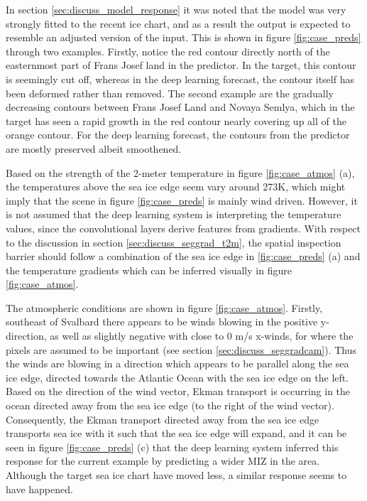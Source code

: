 \documentclass[../main/thesis]{subfiles}
\begin{document}
In section \ref{sec:discuss_model_response} it was noted that the model was very strongly fitted to the recent ice chart, and as a result the output is expected to resemble an adjusted version of the input. This is shown in figure \ref{fig:case_preds} through two examples. Firstly, notice the red contour directly north of the easternmost part of Frans Josef land in the predictor. In the target, this contour is seemingly cut off, whereas in the deep learning forecast, the contour itself has been deformed rather than removed. The second example are the gradually decreasing contours between Frans Josef Land and Novaya Semlya, which in the target has seen a rapid growth in the red contour nearly covering up all of the orange contour. For the deep learning forecast, the contours from the predictor are mostly preserved albeit smoothened.

Based on the strength of the 2-meter temperature in figure \ref{fig:case_atmos} (a), the temperatures above the sea ice edge seem vary around 273K, which might imply that the scene in figure \ref{fig:case_preds} is mainly wind driven. However, it is not assumed that the deep learning system is interpreting the temperature values, since the convolutional layers derive features from gradients. With respect to the discussion in section \ref{sec:discuss_seggrad_t2m}, the spatial inspection barrier should follow a combination of the sea ice edge in \ref{fig:case_preds} (a) and the temperature gradients which can be inferred visually in figure \ref{fig:case_atmos}.

The atmospheric conditions are shown in figure \ref{fig:case_atmos}. Firstly, southeast of Svalbard there appears to be winds blowing in the positive y-direction, as well as slightly negative with close to 0 m/s x-winds, for where the pixels are assumed to be important (see section \ref{sec:discuss_seggradcam}). Thus the winds are blowing in a direction which appears to be parallel along the sea ice edge, directed towards the Atlantic Ocean with the sea ice edge on the left. Based on the direction of the wind vector, Ekman transport is occurring in the ocean directed away from the sea ice edge (to the right of the wind vector). Consequently, the Ekman transport directed away from the sea ice edge transports sea ice with it \citep{Fennel1998} such that the sea ice edge will expand, and it can be seen in figure \ref{fig:case_preds} (c) that the deep learning system inferred this response for the current example by predicting a wider MIZ in the area. Although the target sea ice chart have moved less, a similar response seems to have happened.
\end{document}
